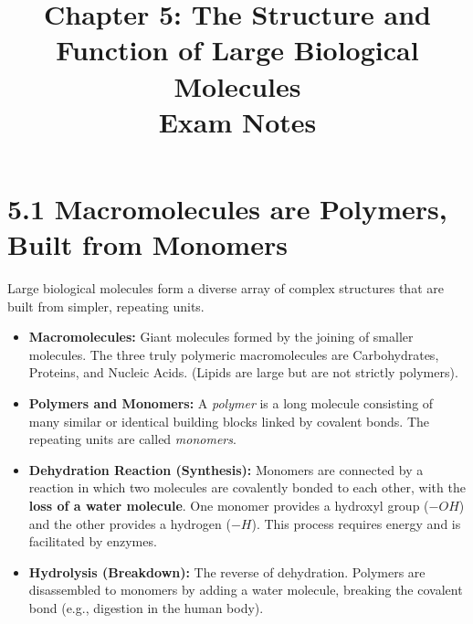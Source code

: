 \documentclass[11pt, a4paper]{article}
\title{\textbf{Chapter 5: The Structure and Function of Large Biological Molecules \\ Exam Notes}}
\author{}
\date{}
\begin{document}
\maketitle

\section*{5.1 Macromolecules are Polymers, Built from Monomers}
Large biological molecules form a diverse array of complex structures that are built from simpler, repeating units.
\begin{itemize}
    \item \textbf{Macromolecules:} Giant molecules formed by the joining of smaller molecules. The three truly polymeric macromolecules are Carbohydrates, Proteins, and Nucleic Acids. (Lipids are large but are not strictly polymers).
    \item \textbf{Polymers and Monomers:} A \textit{polymer} is a long molecule consisting of many similar or identical building blocks linked by covalent bonds. The repeating units are called \textit{monomers}.
    \item \textbf{Dehydration Reaction (Synthesis):} Monomers are connected by a reaction in which two molecules are covalently bonded to each other, with the \textbf{loss of a water molecule}. One monomer provides a hydroxyl group ($-OH$) and the other provides a hydrogen ($-H$). This process requires energy and is facilitated by enzymes.
    \item \textbf{Hydrolysis (Breakdown):} The reverse of dehydration. Polymers are disassembled to monomers by adding a water molecule, breaking the covalent bond (e.g., digestion in the human body).
\end{itemize}
\end{document}
